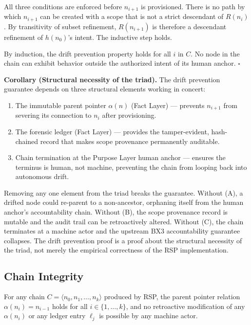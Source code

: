 All three conditions are enforced before $n_{i+1}$ is provisioned.  There is no
path by which $n_{i+1}$ can be created with a scope that is not a strict
descendant of $R(n_i)$.  By transitivity of subset refinement, $R(n_{i+1})$ is
therefore a descendant refinement of $h(n_0)$'s intent.  The inductive step holds.

By induction, the drift prevention property holds for all $i$ in $C$.  No node
in the chain can exhibit behavior outside the authorized intent of its human
anchor.  $\square$

\medskip\noindent\textbf{Corollary (Structural necessity of the triad).}
The drift prevention guarantee depends on three structural elements working in
concert:

\begin{enumerate}
  \item[(A)] The immutable parent pointer $\alpha(n)$ (Fact Layer) ---
    prevents $n_{i+1}$ from severing its connection to $n_i$ after provisioning.
  \item[(B)] The forensic ledger (Fact Layer) --- provides the tamper-evident,
    hash-chained record that makes scope provenance permanently auditable.
  \item[(C)] Chain termination at the Purpose Layer human anchor --- ensures the
    terminus is human, not machine, preventing the chain from looping back into
    autonomous drift.
\end{enumerate}

Removing any one element from the triad breaks the guarantee.  Without (A), a
drifted node could re-parent to a non-ancestor, orphaning itself from the human
anchor's accountability chain.  Without (B), the scope provenance record is
mutable and the audit trail can be retroactively altered.  Without (C), the
chain terminates at a machine actor and the upstream BX3 accountability guarantee
collapses.  The drift prevention proof is a proof about the structural necessity
of the triad, not merely the empirical correctness of the RSP implementation.

\subsection{Chain Integrity}
\label{sec:rs-chain-integrity}

\begin{thrm}
\label{thrm:chain-integrity}
For any chain $C = \langle n_0, n_1, \ldots, n_k \rangle$ produced by RSP, the
parent pointer relation $\alpha(n_i) = n_{i-1}$ holds for all $i \in \{1, \ldots,
k\}$, and no retroactive modification of any $\alpha(n_i)$ or any ledger entry
$\ell_j$ is possible by any machine actor.
\end{thrm}

